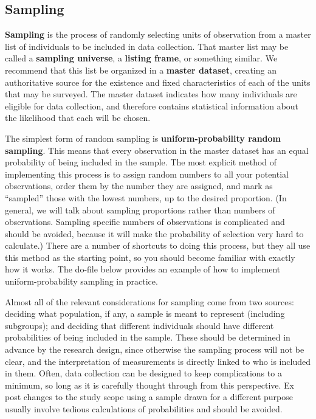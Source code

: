 


\subsection{Sampling}

\textbf{Sampling} is the process of randomly selecting units of observation
from a master list of individuals to be included in data collection.
That master list may be called a \textbf{sampling universe}, a \textbf{listing frame}, or something similar.
We recommend that this list be organized in a \textbf{master dataset},
creating an authoritative source for the existence and fixed
characteristics of each of the units that may be surveyed.
The master dataset indicates how many individuals are eligible for data collection,
and therefore contains statistical information about the likelihood that each will be chosen.

The simplest form of random sampling is \textbf{uniform-probability random sampling}.
This means that every observation in the master dataset
has an equal probability of being included in the sample.
The most explicit method of implementing this process
is to assign random numbers to all your potential observations,
order them by the number they are assigned,
and mark as ``sampled'' those with the lowest numbers, up to the desired proportion.
(In general, we will talk about sampling proportions rather than numbers of observations.
Sampling specific numbers of observations is complicated and should be avoided,
because it will make the probability of selection very hard to calculate.)
There are a number of shortcuts to doing this process,
but they all use this method as the starting point,
so you should become familiar with exactly how it works.
The do-file below provides an example of how to implement uniform-probability sampling in practice. 


Almost all of the relevant considerations for sampling come from two sources:
deciding what population, if any, a sample is meant to represent (including subgroups);
and deciding that different individuals should have different probabilities
of being included in the sample.
These should be determined in advance by the research design,
since otherwise the sampling process will not be clear,
and the interpretation of measurements is directly linked to who is included in them.
Often, data collection can be designed to keep complications to a minimum,
so long as it is carefully thought through from this perspective.
Ex post changes to the study scope using a sample drawn for a different purpose
usually involve tedious calculations of probabilities and should be avoided.


